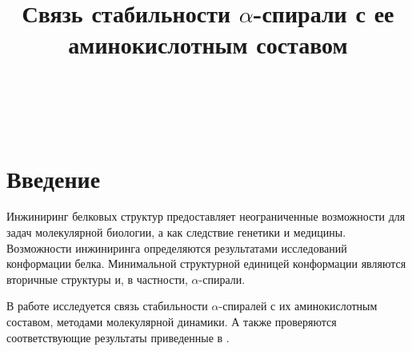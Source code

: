 \documentclass[
11pt,%
tightenlines,%
twoside,%
onecolumn,%
nofloats,%
nobibnotes,%
nofootinbib,%
superscriptaddress,%
noshowpacs,%
centertags]%
{revtex4}
\begin{document}

\title{Связь стабильности $\alpha$-спирали с ее аминокислотным составом}

\author{~}

\author{~}


\received{: \today} %





\maketitle

\section{Введение}
Инжиниринг белковых структур предоставляет неограниченные возможности для задач молекулярной биологии,
а как следствие генетики и медицины. 
Возможности инжиниринга определяются результатами исследований конформации белка.
Минимальной структурной единицей конформации являются вторичные структуры и, в частности, $\alpha$-спирали.\par
В работе исследуется связь стабильности $\alpha$-спиралей с их аминокислотным составом,
методами молекулярной динамики. 
А также проверяются соответствующие результаты приведенные в \cite{texbook}.
\end{document}
